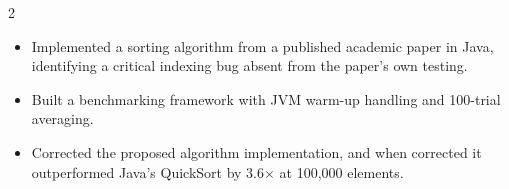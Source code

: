 \documentclass[10pt,a4paper,withhyper]{altacv}
\begin{document}
\begin{paracol}{2}
\begin{itemize}
\end{itemize}
\divider
{}
\begin{itemize}
    \item Implemented a sorting algorithm from a published academic paper in Java, identifying a critical indexing bug absent from the paper's own testing.
    \item Built a benchmarking framework with JVM warm-up handling and 100-trial averaging.
    \item Corrected the proposed algorithm implementation, and when corrected it outperformed Java's QuickSort by 3.6$\times$ at 100,000 elements.
\end{itemize}

\medskip


\switchcolumn



\\
\\

\divider\smallskip

\\
\\






\smallskip


\end{paracol}
\end{document}

